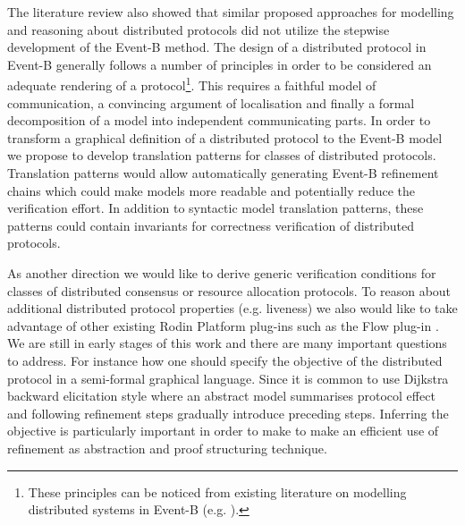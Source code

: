 \documentclass{llncs}
\begin{document}
		The literature review also showed that similar proposed approaches for modelling and reasoning about distributed protocols did not utilize the stepwise development of the Event-B method. The design of a distributed protocol in Event-B generally follows a number of principles in order to be considered an adequate rendering of a protocol\footnote{These principles can be noticed from existing literature on modelling distributed systems in Event-B (e.g. \cite{Cansell} \cite{Hoang} \cite{Yadav}).}. This requires a faithful model of communication, a convincing argument of localisation and finally a formal decomposition of a model into independent communicating parts. In order to transform a graphical definition of a distributed protocol to the Event-B model we propose to develop translation patterns for classes of distributed protocols. Translation patterns would allow automatically generating Event-B refinement chains which could make models more readable and potentially reduce the verification effort. In addition to syntactic model translation patterns, these patterns could contain invariants for correctness verification of distributed protocols. 
		
		As another direction we would like to derive generic verification conditions for classes of distributed consensus or resource allocation protocols. To reason about additional distributed protocol properties (e.g. liveness) we also would like to take advantage of other existing Rodin Platform plug-ins such as the Flow plug-in \cite{flow}. We are still in early stages of this work and there are many important questions to address. For instance how one should specify the objective of the distributed protocol in a semi-formal graphical language. Since it is common to use Dijkstra backward elicitation style where an abstract model summarises protocol effect and following refinement steps gradually introduce preceding steps. Inferring the objective is particularly important in order to make to make an efficient use of refinement as abstraction and proof structuring technique. 
		
		
		
\end{document}
